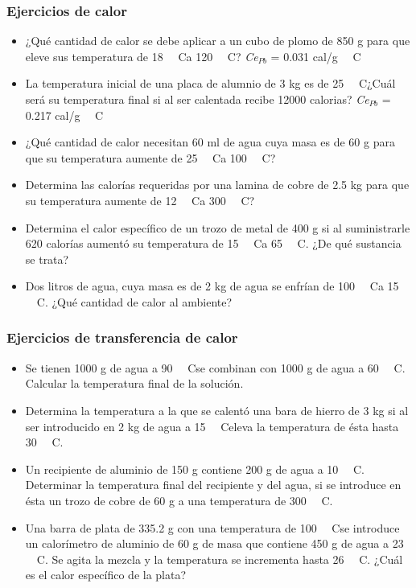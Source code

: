 \documentclass[handout]{beamer}
\newcommand{\celsius}{~\textdegree~C}
\begin{document}
\begin{frame}[allowframebreaks,t]
  \frametitle{Ejercicios de calor}
  \begin{itemize}
  \item ¿Qué cantidad de calor se debe aplicar a un cubo de plomo de 850 g para que eleve
    sus temperatura de 18 \celsius a 120 \celsius? \textit{Ce}$_{Pb}$ = 0.031 cal/g \celsius
  \item La temperatura inicial de una placa de alumnio de 3 kg es de 25 \celsius ¿Cuál
    será su temperatura final si al ser calentada recibe 12000 calorias?
    \textit{Ce}$_{Pb}$ = 0.217 cal/g \celsius
  \item ¿Qué cantidad de calor necesitan 60 ml de agua cuya masa es de 60 g para que su
    temperatura aumente de 25 \celsius a 100 \celsius?
  \item Determina las calorías requeridas por una lamina de cobre de 2.5 kg para que su
    temperatura aumente de 12 \celsius a 300 \celsius?
  \item Determina el calor específico de un trozo de metal de 400 g si al suministrarle
    620 calorías aumentó su temperatura de 15 \celsius a 65 \celsius. ¿De qué sustancia se trata?
  \item Dos litros de agua, cuya masa es de 2 kg de agua se enfrían de 100 \celsius a 15
    \celsius. ¿Qué cantidad de calor al ambiente?
  \end{itemize}
\end{frame}


\begin{frame}[allowframebreaks,t]
  \frametitle{Ejercicios de transferencia de calor}
  \begin{itemize}
  \item Se tienen 1000 g de agua a 90 \celsius se combinan con 1000 g de agua a 60
    \celsius. Calcular la temperatura final de la solución.
  \item Determina la temperatura a la que se calentó una bara de hierro de 3 kg si al ser
    introducido en 2 kg de agua a 15 \celsius eleva la temperatura de ésta hasta 30 \celsius.
  \item Un recipiente de aluminio de 150 g contiene 200 g de agua a 10
    \celsius. Determinar la temperatura final del recipiente y del agua, si se introduce
    en ésta un trozo de cobre de 60 g a una temperatura de 300 \celsius.
  \item Una barra de plata de 335.2 g con una temperatura de 100 \celsius se introduce un
    calorímetro de aluminio de  60 g de masa que contiene  450 g de agua a 23 \celsius. Se
    agita la mezcla y la temperatura se incrementa hasta 26 \celsius. ¿Cuál es el calor
    específico de la plata?
  \end{itemize}
  
\end{frame}
\end{document}
